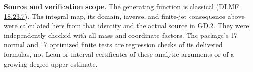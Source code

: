 \textbf{Source and verification scope.}
The generating function is classical
(\href{https://dlmf.nist.gov/18.23.E7}{DLMF 18.23.7}).
The integral map, its domain, inverse, and finite-jet consequence above
were calculated here from that identity and the actual source in GD.2.
They were independently checked with all mass and coordinate factors.
The package's 17 normal and 17 optimized finite tests are regression
checks of its delivered formulas, not Lean or interval certificates of
these analytic arguments or of a growing-degree upper estimate.
